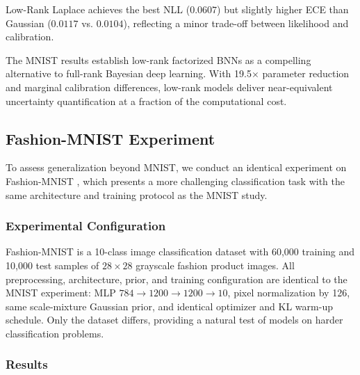 \documentclass{article}
\theoremstyle{plain}
\theoremstyle{definition}
\theoremstyle{remark}
\begin{document}
Low-Rank Laplace achieves the best NLL ($0.0607$) but slightly higher ECE than Gaussian ($0.0117$ vs. $0.0104$), reflecting a minor trade-off between likelihood and calibration. 

The MNIST results establish low-rank factorized BNNs as a compelling alternative to full-rank Bayesian deep learning. With 19.5$\times$ parameter reduction and marginal calibration differences, low-rank models deliver near-equivalent uncertainty quantification at a fraction of the computational cost.

\subsection{Fashion-MNIST Experiment}\label{app:results:fmnist}

To assess generalization beyond MNIST, we conduct an identical experiment on Fashion-MNIST \cite{xiao2017fashion}, which presents a more challenging classification task with the same architecture and training protocol as the MNIST study.

\subsubsection{Experimental Configuration}

Fashion-MNIST is a 10-class image classification dataset with 60,000 training and 10,000 test samples of $28 \times 28$ grayscale fashion product images. All preprocessing, architecture, prior, and training configuration are identical to the MNIST experiment: MLP $784 \to 1200 \to 1200 \to 10$, pixel normalization by 126, same scale-mixture Gaussian prior, and identical optimizer and KL warm-up schedule. Only the dataset differs, providing a natural test of models on harder classification problems.

\subsubsection{Results}
\end{document}
